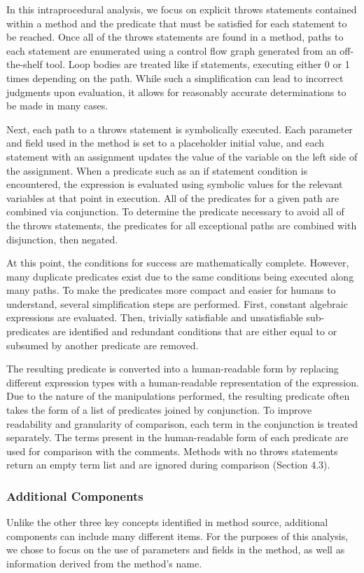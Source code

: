 \documentclass[preprint]{sigplanconf}
\begin{document}
In this intraprocedural analysis, we focus on explicit throws statements contained within a method and the predicate that must be satisfied for each statement to be reached. Once all of the throws statements are found in a method, paths to each statement are enumerated using a control flow graph generated from an off-the-shelf tool. Loop bodies are treated like if statements, executing either 0 or 1 times depending on the path. While such a simplification can lead to incorrect judgments upon evaluation, it allows for reasonably accurate determinations to be made in many cases.

Next, each path to a throws statement is symbolically executed. Each parameter and field used in the method is set to a placeholder initial value, and each statement with an assignment updates the value of the variable on the left side of the assignment. When a predicate such as an if statement condition is encountered, the expression is evaluated using symbolic values for the relevant variables at that point in execution. All of the predicates for a given path are combined via conjunction. To determine the predicate necessary to avoid all of the throws statements, the predicates for all exceptional paths are combined with disjunction, then negated.

At this point, the conditions for success are mathematically complete. However, many duplicate predicates exist due to the same conditions being executed along many paths. To make the predicates more compact and easier for humans to understand, several simplification steps are performed. First, constant algebraic expressions are evaluated. Then, trivially satisfiable and unsatisfiable sub-predicates are identified and redundant conditions that are either equal to or subsumed by another predicate are removed.

The resulting predicate is converted into a human-readable form by replacing different expression types with a human-readable representation of the expression. Due to the nature of the manipulations performed, the resulting predicate often takes the form of a list of predicates joined by conjunction. To improve readability and granularity of comparison, each term in the conjunction is treated separately. The terms present in the human-readable form of each predicate are used for comparison with the comments. Methods with no throws statements return an empty term list and are ignored during comparison (Section 4.3).

\subsubsection{Additional Components}
Unlike the other three key concepts identified in method source, additional components can include many different items. For the purposes of this analysis, we chose to focus on the use of parameters and fields in the method, as well as information derived from the method's name.
\end{document}
